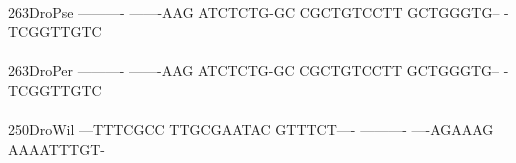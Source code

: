 \documentclass[11pt,twoside,reqno,a4paper]{article}
\begin{document}
{\hspace*{4\charwidth}\hspace*{7\charwidth}\hspace*{1\charwidth}\hspace*{1\charwidth}\hspace*{1\charwidth}\hspace*{1\charwidth}\hspace*{1\charwidth}\hspace*{1\charwidth}\\
263\hspace*{1\charwidth}DroPse	----------	-------AAG	ATCTCTG-GC	CGCTGTCCTT	GCTGGGTG--	-TCGGTTGTC	\\
\hspace*{4\charwidth}\hspace*{7\charwidth}\hspace*{1\charwidth}\hspace*{1\charwidth}\hspace*{1\charwidth}\hspace*{1\charwidth}\hspace*{1\charwidth}\hspace*{1\charwidth}\\
263\hspace*{1\charwidth}DroPer	----------	-------AAG	ATCTCTG-GC	CGCTGTCCTT	GCTGGGTG--	-TCGGTTGTC	\\
\hspace*{4\charwidth}\hspace*{7\charwidth}\hspace*{1\charwidth}\hspace*{1\charwidth}\hspace*{1\charwidth}\hspace*{1\charwidth}\hspace*{1\charwidth}\hspace*{1\charwidth}\\
250\hspace*{1\charwidth}DroWil	---TTTCGCC	TTGCGAATAC	GTTTCT----	----------	----AGAAAG	AAAATTTGT-	\\
\hspace*{4\charwidth}\hspace*{7\charwidth}\hspace*{1\charwidth}\hspace*{1\charwidth}\hspace*{1\charwidth}\hspace*{1\charwidth}\hspace*{1\charwidth}\hspace*{1\charwidth}\\
}
\end{document}
